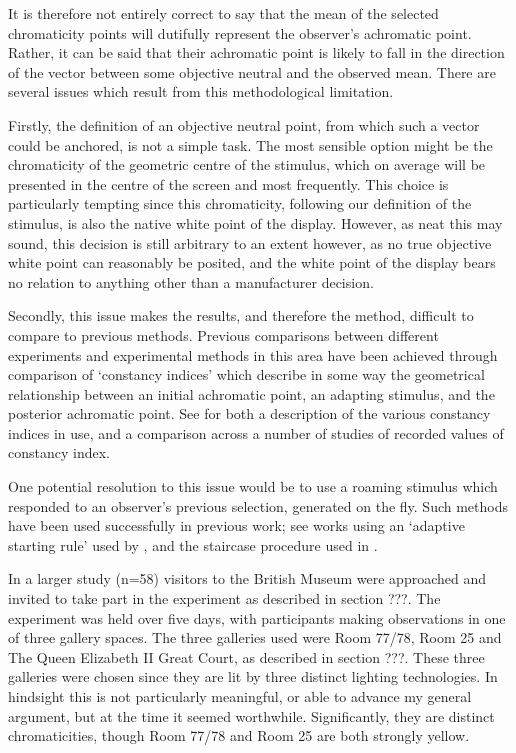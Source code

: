 
It is therefore not entirely correct to say that the mean of the selected chromaticity points will dutifully represent the observer's achromatic point. Rather, it can be said that their achromatic point is likely to fall in the direction of the vector between some objective neutral and the observed mean. There are several issues which result from this methodological limitation.

Firstly, the definition of an objective neutral point, from which such a vector could be anchored, is not a simple task. The most sensible option might be the chromaticity of the geometric centre of the stimulus, which on average will be presented in the centre of the screen and most frequently. This choice is particularly tempting since this chromaticity, following our definition of the stimulus, is also the native white point of the display. However, as neat this may sound, this decision is still arbitrary to an extent however, as no true objective white point can reasonably be posited, and the white point of the display bears no relation to anything other than a manufacturer decision.

Secondly, this issue makes the results, and therefore the method, difficult to compare to previous methods. Previous comparisons between different experiments and experimental methods in this area have been achieved through comparison of `constancy indices' which describe in some way the geometrical relationship between an initial achromatic point, an adapting stimulus, and the posterior achromatic point. See \citet{foster_color_2011} for both a description of the various constancy indices in use, and a comparison across a number of studies of recorded values of constancy index.

One potential resolution to this issue would be to use a roaming stimulus which responded to an observer's previous selection, generated on the fly. Such methods have been used successfully in previous work; see works using an `adaptive starting rule' used by \citet{delahunt_evaluation_2001}, and the staircase procedure used in \citet{lee_after-eects_2017}.

In a larger study (n=58) visitors to the British Museum were approached and invited to take part in the experiment as described in section ???. The experiment was held over five days, with participants making observations in one of three gallery spaces. The three galleries used were Room 77/78, Room 25 and The Queen Elizabeth II Great Court, as described in section ???. These three galleries were chosen since they are lit by three distinct lighting technologies. In hindsight this is not particularly meaningful, or able to advance my general argument, but at the time it seemed worthwhile. Significantly, they are distinct chromaticities, though Room 77/78 and Room 25 are both strongly yellow.

